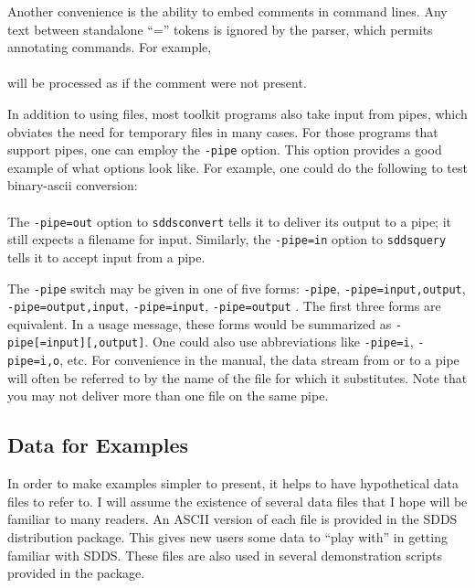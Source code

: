\documentclass[11pt]{article}
\begin{document}
Another convenience is the ability to embed comments in command lines.  Any text between
standalone ``='' tokens is ignored by the parser, which permits annotating commands.  For example,\\
\\
will be processed as if the comment were not present.

In addition to using files, most toolkit programs also take input from pipes, which obviates the need for temporary
files in many cases.  For those programs that support pipes, one can employ the {\tt -pipe} option.  This option
provides a good example of what options look like.  For example, one could do the following to test binary-ascii
conversion:\\
\\
The {\tt -pipe=out} option to {\tt sddsconvert} tells it to deliver its output to a pipe; it still
expects a filename for input.  Similarly, the {\tt -pipe=in} option to {\tt sddsquery} tells it to
accept input from a pipe.  

The {\tt -pipe} switch may be given in one of five forms: {\tt -pipe}, {\tt -pipe=input,output}, {\tt
-pipe=output,input}, {\tt -pipe=input}, {\tt -pipe=output} .  The first three forms are equivalent.  In a usage
message, these forms would be summarized as {\tt -pipe[=input][,output]}.  One could also use abbreviations like
{\tt -pipe=i}, {\tt -pipe=i,o}, etc.  For convenience in the manual, the data stream from or to a pipe will 
often be referred to by the name of the file for which it substitutes.  Note that you may not deliver more
than one file on the same pipe.

\subsection{Data for Examples}
\label{exampleData}

In order to make examples simpler to present, it helps to have hypothetical data files to refer to.  I will assume the
existence of several data files that I hope will be familiar to many readers.  An ASCII version of each file is
provided in the SDDS distribution package.  This gives new users some data to ``play with'' in getting familiar with
SDDS.  These files are also used in several demonstration scripts provided in the package.  
\end{document}
